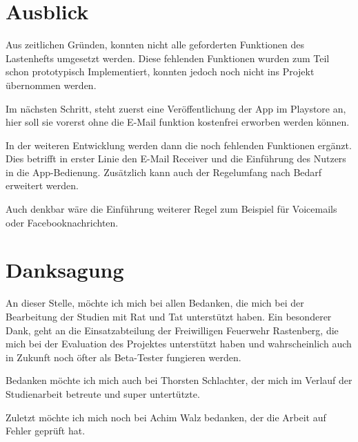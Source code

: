 \section{Ausblick}
Aus zeitlichen Gr\"unden, konnten nicht alle geforderten Funktionen des Lastenhefts umgesetzt werden. Diese fehlenden Funktionen wurden zum Teil schon prototypisch Implementiert, konnten jedoch noch nicht ins Projekt \"ubernommen werden.

Im n\"achsten Schritt, steht zuerst eine Ver\"offentlichung der App im Playstore an, hier soll sie vorerst ohne die E-Mail funktion kostenfrei erworben werden k\"onnen.

In der weiteren Entwicklung werden dann die noch fehlenden Funktionen erg\"anzt. Dies betrifft in erster Linie den E-Mail Receiver und die Einf\"uhrung des Nutzers in die App-Bedienung. Zus\"atzlich kann auch der Regelumfang nach Bedarf erweitert werden. 

Auch denkbar w\"are die Einf\"uhrung weiterer Regel zum Beispiel f\"ur Voicemails oder Facebooknachrichten.

\section{Danksagung}
An dieser Stelle, m\"ochte ich mich bei allen Bedanken, die mich bei der Bearbeitung der Studien mit Rat und Tat unterst\"utzt haben.
Ein besonderer Dank, geht an die Einsatzabteilung der Freiwilligen Feuerwehr Rastenberg, die mich bei der Evaluation des Projektes unterst\"utzt haben und wahrscheinlich auch in Zukunft noch \"ofter als Beta-Tester fungieren werden.

Bedanken m\"ochte ich mich auch bei Thorsten Schlachter, der mich im Verlauf der Studienarbeit betreute und super untert\"utzte.

Zuletzt m\"ochte ich mich noch bei Achim Walz bedanken, der die Arbeit auf Fehler gepr\"uft hat. 